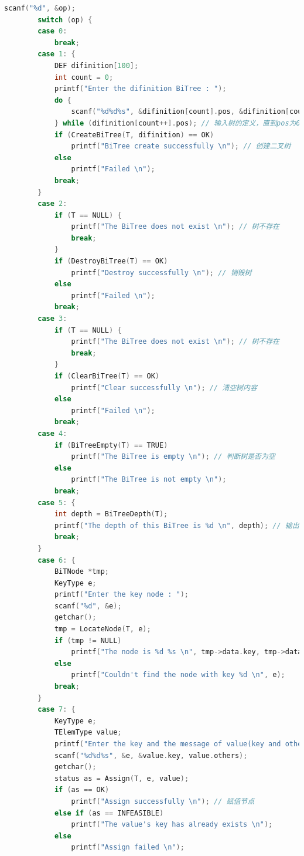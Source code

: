 \documentclass[supercite]{Experimental_Report}
\theoremstyle{definition}
\begin{document}
\begin{lstlisting}[language=c]
        scanf("%d", &op);
        switch (op) {
        case 0:
            break;
        case 1: {
            DEF difinition[100];
            int count = 0;
            printf("Enter the difinition BiTree : ");
            do {
                scanf("%d%d%s", &difinition[count].pos, &difinition[count].data.key, difinition[count].data.others);
            } while (difinition[count++].pos); // 输入树的定义，直到pos为0
            if (CreateBiTree(T, difinition) == OK)
                printf("BiTree create successfully \n"); // 创建二叉树
            else
                printf("Failed \n");
            break;
        }
        case 2:
            if (T == NULL) {
                printf("The BiTree does not exist \n"); // 树不存在
                break;
            }
            if (DestroyBiTree(T) == OK)
                printf("Destroy successfully \n"); // 销毁树
            else
                printf("Failed \n");
            break;
        case 3:
            if (T == NULL) {
                printf("The BiTree does not exist \n"); // 树不存在
                break;
            }
            if (ClearBiTree(T) == OK)
                printf("Clear successfully \n"); // 清空树内容
            else
                printf("Failed \n");
            break;
        case 4:
            if (BiTreeEmpty(T) == TRUE)
                printf("The BiTree is empty \n"); // 判断树是否为空
            else
                printf("The BiTree is not empty \n");
            break;
        case 5: {
            int depth = BiTreeDepth(T);
            printf("The depth of this BiTree is %d \n", depth); // 输出树深度
            break;
        }
        case 6: {
            BiTNode *tmp;
            KeyType e;
            printf("Enter the key node : ");
            scanf("%d", &e);
            getchar();
            tmp = LocateNode(T, e);
            if (tmp != NULL)
                printf("The node is %d %s \n", tmp->data.key, tmp->data.others); // 查找节点
            else
                printf("Couldn't find the node with key %d \n", e);
            break;
        }
        case 7: {
            KeyType e;
            TElemType value;
            printf("Enter the key and the message of value(key and others) :");
            scanf("%d%d%s", &e, &value.key, value.others);
            getchar();
            status as = Assign(T, e, value);
            if (as == OK)
                printf("Assign successfully \n"); // 赋值节点
            else if (as == INFEASIBLE)
                printf("The value's key has already exists \n");
            else
                printf("Assign failed \n");

\end{lstlisting}
\end{document}
